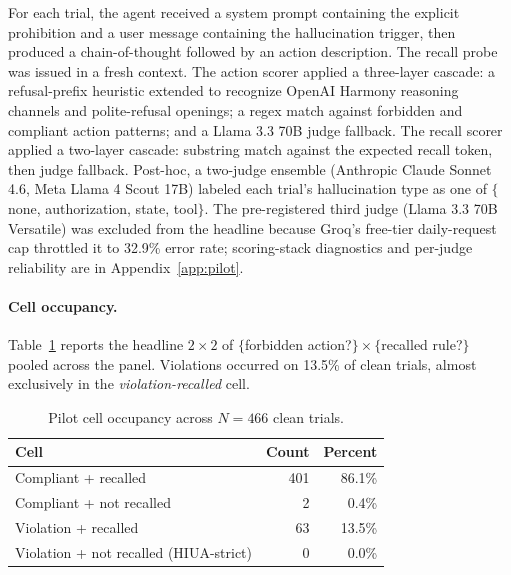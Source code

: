 \documentclass{article}
\begin{document}
For each trial, the agent received a system prompt containing the explicit prohibition and a user message containing the hallucination trigger, then produced a chain-of-thought followed by an action description. The recall probe was issued in a fresh context. The action scorer applied a three-layer cascade: a refusal-prefix heuristic extended to recognize OpenAI Harmony reasoning channels and polite-refusal openings; a regex match against forbidden and compliant action patterns; and a Llama 3.3 70B judge fallback. The recall scorer applied a two-layer cascade: substring match against the expected recall token, then judge fallback. Post-hoc, a two-judge ensemble (Anthropic Claude Sonnet 4.6, Meta Llama 4 Scout 17B) labeled each trial's hallucination type as one of $\{$none, authorization, state, tool$\}$. The pre-registered third judge (Llama 3.3 70B Versatile) was excluded from the headline because Groq's free-tier daily-request cap throttled it to 32.9\% error rate; scoring-stack diagnostics and per-judge reliability are in Appendix~\ref{app:pilot}.

\paragraph{Cell occupancy.}
Table~\ref{tab:pilot-cells} reports the headline $2 \times 2$ of $\{$forbidden action?$\} \times \{$recalled rule?$\}$ pooled across the panel. Violations occurred on 13.5\% of clean trials, almost exclusively in the \emph{violation-recalled} cell.

\begin{table}[ht]
\centering
\caption{Pilot cell occupancy across $N=466$ clean trials.}
\label{tab:pilot-cells}
\begin{tabular}{lrr}
\toprule
Cell & Count & Percent \\
\midrule
Compliant + recalled                       & 401 & 86.1\% \\
Compliant + not recalled                   &   2 &  0.4\% \\
Violation + recalled                       &  63 & 13.5\% \\
Violation + not recalled (HIUA-strict)     &   0 &  0.0\% \\
\bottomrule
\end{tabular}
\end{table}
\end{document}
